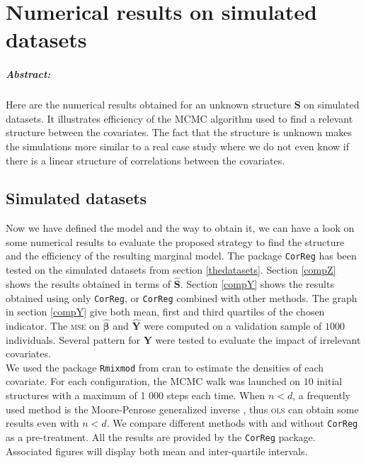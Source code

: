 \documentclass[12pt,a4paper]{report}
\begin{document}
	\chapter{Numerical results on simulated datasets} \label{sectionsimul}
\paragraph{Abstract:} Here are the numerical results obtained for an unknown structure $\boldsymbol{S}$ on simulated datasets. It illustrates efficiency of the MCMC algorithm used to find a relevant structure between the covariates. The fact that the structure is unknown makes the simulations more similar to a real case study where we do not even know if there is a linear structure of correlations between the covariates.
		 

	\section{Simulated datasets}	
	Now we have defined the model and the way to obtain it, we can have a look on some numerical results to evaluate the proposed strategy to find the structure and the efficiency of the resulting marginal model.	The package {\tt CorReg} has been tested on the simulated datasets from section \ref{thedatasets}.
Section \ref{compZ} shows the results obtained in terms of $\hat{\boldsymbol{S}}$. Section \ref{compY} shows the results obtained using only {\tt CorReg}, or {\tt CorReg} combined with other methods. The graph in section \ref{compY} give both mean, first and third quartiles of the chosen indicator. The \textsc{mse} on $\hat{\boldsymbol{\beta}}$ and $\hat{\boldsymbol{Y}}$ were computed on a validation sample of $1 000$ individuals. Several pattern for $\boldsymbol{Y}$ were tested to evaluate the impact of irrelevant covariates.\\

	We used the package { \tt Rmixmod} from {\sc cran} \cite{packageRmixmod} to estimate the densities of each covariate. For each configuration, the MCMC walk was launched on $10$ initial structures with a maximum of 1 000 steps each time.
	When $n<d$, a frequently used method is the Moore-Penrose generalized inverse \cite{katsikis2008fast}, thus \textsc{ols} can obtain some results even with $n<d$. %
	We compare different methods with and without {\tt CorReg} as a pre-treatment. All the results are provided by the {\tt CorReg} package. Associated figures will display both mean and inter-quartile intervals.
	
\end{document}
